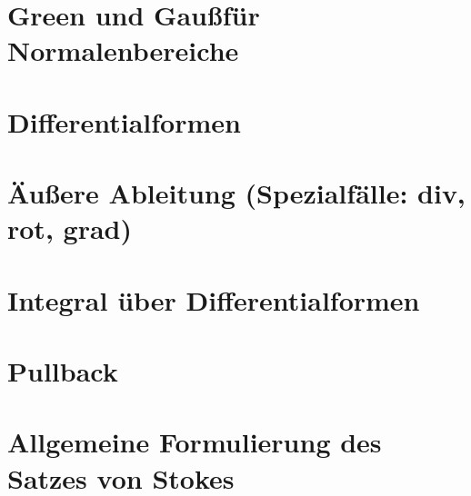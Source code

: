 \section{Green und Gau\ss f\"ur Normalenbereiche}

\section{Differentialformen}

\section{\"Au\ss ere Ableitung (Spezialf\"alle: div, rot, grad)}

\section{Integral \"uber Differentialformen}

\section{Pullback}

\section{Allgemeine Formulierung des Satzes von Stokes}